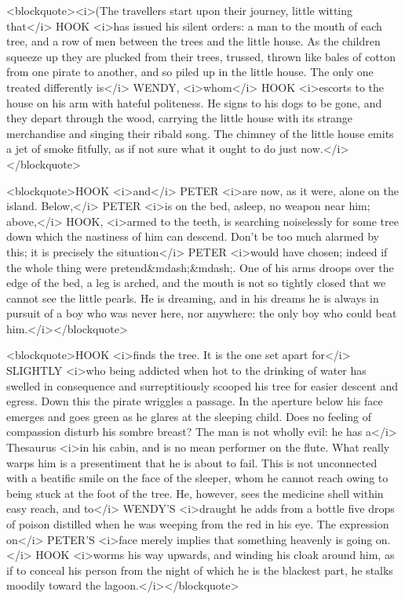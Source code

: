 <blockquote><i>(The travellers start upon their journey, little witting that</i> HOOK <i>has issued his silent orders: a man to the mouth of each tree, and a row of men between the trees and the little house. As the children squeeze up they are plucked from their trees, trussed, thrown like bales of cotton from one pirate to another, and so piled up in the little house. The only one treated differently is</i> WENDY, <i>whom</i> HOOK <i>escorts to the house on his arm with hateful politeness. He signs to his dogs to be gone, and they depart through the wood, carrying the little house with its strange merchandise and singing their ribald song. The chimney of the little house emits a jet of smoke fitfully, as if not sure what it ought to do just now.</i></blockquote>

<blockquote>HOOK <i>and</i> PETER <i>are now, as it were, alone on the island. Below,</i> PETER <i>is on the bed, asleep, no weapon near him; above,</i> HOOK, <i>armed to the teeth, is searching noiselessly for some tree down which the nastiness of him can descend. Don't be too much alarmed by this; it is precisely the situation</i> PETER <i>would have chosen; indeed if the whole thing were pretend&mdash;&mdash;. One of his arms droops over the edge of the bed, a leg is arched, and the mouth is not so tightly closed that we cannot see the little pearls. He is dreaming, and in his dreams he is always in pursuit of a boy who was never here, nor anywhere: the only boy who could beat him.</i></blockquote>

<blockquote>HOOK <i>finds the tree. It is the one set apart for</i> SLIGHTLY <i>who being addicted when hot to the drinking of water has swelled in consequence and surreptitiously scooped his tree for easier descent and egress. Down this the pirate wriggles a passage. In the aperture below his face emerges and goes green as he glares at the sleeping child. Does no feeling of compassion disturb his sombre breast? The man is not wholly evil: he has a</i> Thesaurus <i>in his cabin, and is no mean performer on the flute. What really warps him is a presentiment that he is about to fail. This is not unconnected with a beatific smile on the face of the sleeper, whom he cannot reach owing to being stuck at the foot of the tree. He, however, sees the medicine shell within easy reach, and to</i> WENDY'S <i>draught he adds from a bottle five drops of poison distilled when he was weeping from the red in his eye. The expression on</i> PETER'S <i>face merely implies that something heavenly is going on.</i> HOOK <i>worms his way upwards, and winding his cloak around him, as if to conceal his person from the night of which he is the blackest part, he stalks moodily toward the lagoon.</i></blockquote>

